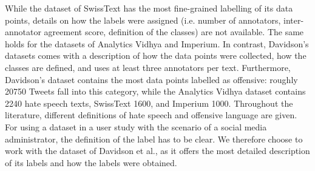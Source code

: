\setcounter{footnote}{4}
\noindent While the dataset of SwissText has the most fine-grained labelling of its data points, details on how the labels were assigned (i.e. number of annotators, inter-annotator agreement score, definition of the classes) are not available. The same holds for the datasets of Analytics Vidhya and Imperium.\newline
In contrast, Davidson's datasets comes with a description of how the data points were collected, how the classes are defined, and uses at least three annotators per text. Furthermore, Davidson's dataset contains the most data points labelled as offensive: roughly 20750 Tweets fall into this category, while the Analytics Vidhya dataset contains 2240 hate speech texts, SwissText 1600, and Imperium 1000.\newline
Throughout the literature, different definitions of hate speech and offensive language are given. For using a dataset in a user study with the scenario of a social media administrator, the definition of the label has to be clear. We therefore choose to work with the dataset of Davidson et al., as it offers the most detailed description of its labels and how the labels were obtained.


